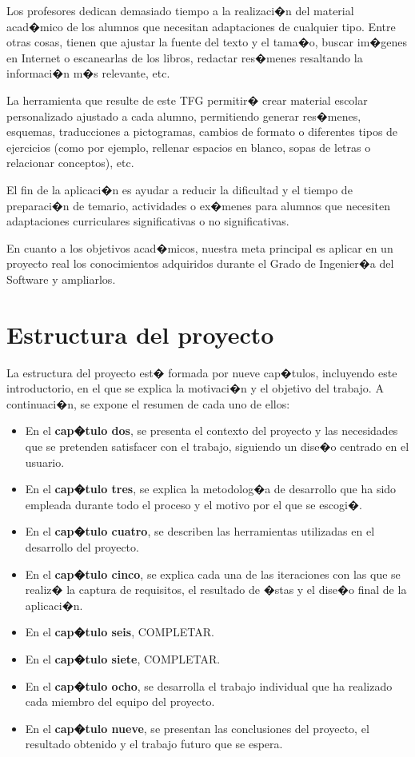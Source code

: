 Los profesores dedican demasiado tiempo a la realizaci�n del material acad�mico de los alumnos que necesitan adaptaciones de cualquier tipo. Entre otras cosas, tienen que ajustar la fuente del texto y el tama�o, buscar im�genes en Internet o escanearlas de los libros, redactar res�menes resaltando la informaci�n m�s relevante, etc.

La herramienta que resulte de este TFG permitir� crear material escolar personalizado ajustado a cada alumno,  permitiendo generar res�menes, esquemas, traducciones a pictogramas, cambios de formato o diferentes tipos de ejercicios (como por ejemplo, rellenar espacios en blanco, sopas de letras o relacionar conceptos), etc.

El fin de la aplicaci�n es ayudar a reducir la dificultad y el tiempo de preparaci�n de temario, actividades o ex�menes para alumnos que necesiten adaptaciones curriculares significativas o no significativas. 

En cuanto a los objetivos acad�micos, nuestra meta principal es aplicar en un proyecto real los conocimientos adquiridos durante el Grado de Ingenier�a del Software y ampliarlos.


\section{Estructura del proyecto}

La estructura del proyecto est� formada por nueve cap�tulos, incluyendo este introductorio, en el que se explica la motivaci�n y el objetivo del trabajo. A continuaci�n, se expone el resumen de cada uno de ellos:

\begin{itemize}
	\item En el  \textbf{cap�tulo dos}, se presenta el contexto del proyecto y las necesidades que se pretenden satisfacer con el trabajo, siguiendo un dise�o centrado en el usuario. 
	\item En el \textbf{cap�tulo tres}, se explica la metodolog�a de desarrollo que ha sido empleada durante todo el proceso y el motivo por el que se escogi�.
	\item En el \textbf{cap�tulo cuatro}, se describen las herramientas utilizadas en el desarrollo del  proyecto.
	\item En el \textbf{cap�tulo cinco}, se explica cada una de las iteraciones con las que se realiz� la captura de requisitos, el resultado de �stas y el dise�o final de la aplicaci�n.
	\item En el \textbf{cap�tulo seis}, COMPLETAR.
	\item En el \textbf{cap�tulo siete}, COMPLETAR.
	\item En el \textbf{cap�tulo ocho}, se desarrolla el trabajo individual que ha realizado cada miembro del equipo del proyecto.
	\item En el \textbf{cap�tulo nueve}, se presentan las conclusiones del proyecto, el resultado obtenido y el trabajo futuro que se espera.
\end{itemize}


